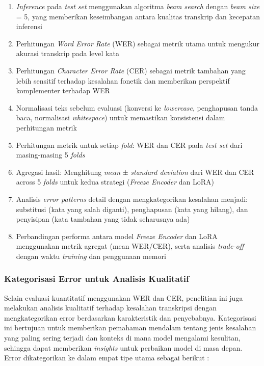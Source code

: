 \begin{enumerate}[noitemsep]
    \item \textit{Inference} pada \textit{test set} menggunakan algoritma \textit{beam search} \cite{radford2023whisper} dengan \textit{beam size} = 5, yang memberikan keseimbangan antara kualitas transkrip dan kecepatan inferensi
    \item Perhitungan \textit{Word Error Rate} (WER) sebagai metrik utama untuk mengukur akurasi transkrip pada level kata
    \item Perhitungan \textit{Character Error Rate} (CER) sebagai metrik tambahan yang lebih sensitif terhadap kesalahan fonetik dan memberikan perspektif komplementer terhadap WER
    \item Normalisasi teks sebelum evaluasi (konversi ke \textit{lowercase}, penghapusan tanda baca, normalisasi \textit{whitespace}) untuk memastikan konsistensi dalam perhitungan metrik
    \item Perhitungan metrik untuk setiap \textit{fold}: WER dan CER pada \textit{test set} dari masing-masing 5 \textit{folds}
    \item Agregasi hasil: Menghitung \textit{mean} ± \textit{standard deviation} dari WER dan CER across 5 \textit{folds} untuk kedua strategi (\textit{Freeze Encoder} dan LoRA)
    \item Analisis \textit{error patterns} detail dengan mengkategorikan kesalahan menjadi: substitusi (kata yang salah diganti), penghapusan (kata yang hilang), dan penyisipan (kata tambahan yang tidak seharusnya ada)
    \item Perbandingan performa antara model \textit{Freeze Encoder} dan LoRA menggunakan metrik agregat (mean WER/CER), serta analisis \textit{trade-off} dengan waktu \textit{training} dan penggunaan memori
\end{enumerate}

\subsubsection{Kategorisasi Error untuk Analisis Kualitatif}

Selain evaluasi kuantitatif menggunakan WER dan CER, penelitian ini juga melakukan analisis kualitatif terhadap kesalahan transkripsi dengan mengkategorikan error berdasarkan karakteristik dan penyebabnya. Kategorisasi ini bertujuan untuk memberikan pemahaman mendalam tentang jenis kesalahan yang paling sering terjadi dan konteks di mana model mengalami kesulitan, sehingga dapat memberikan \textit{insights} untuk perbaikan model di masa depan. Error dikategorikan ke dalam empat tipe utama sebagai berikut \cite{morris2004wer}:

